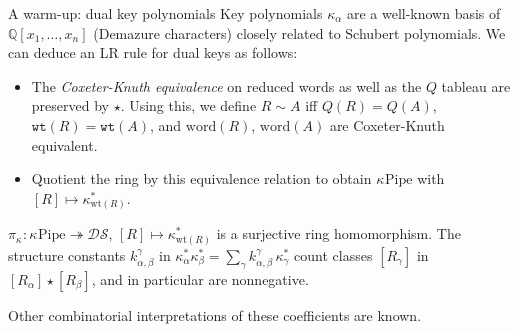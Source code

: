 \documentclass[aspectratio=169]{beamer}
\newcommand{\dcoma}{\mathcal{DS}}
\newcommand{\Key}[1]{\kappa_{#1}}
\newcommand{\RC}{\mathrm{Pipe}}
\newcommand{\wtt}{\mathtt{wt}}
\begin{document}
\begin{frame}{A warm-up: dual key polynomials}
  Key polynomials $\Key{\alpha}$ are a well-known basis of $\mathbb{Q}[x_1,\dots,x_n]$ (Demazure characters) closely related to Schubert polynomials. We can deduce an LR rule for dual keys as follows:
  \begin{itemize}
    \item The \emph{Coxeter-Knuth equivalence}  on reduced words \cite{morse2016crystal} as well as the $Q$ tableau \cite{hamaker2014relating} are preserved by $\star$. Using this, we define $R\sim A$ iff $Q(R)=Q(A)$, $\wtt(R)=\wtt(A)$, and $\mathrm{word}(R)$, $\mathrm{word}(A)$ are Coxeter-Knuth equivalent.
    \item Quotient the ring by this equivalence relation to obtain $\Key{}\RC$ with $[R]\mapsto\Key{\mathrm{wt}(R)}^*$.
  \end{itemize}
  \begin{theorem}[S, 2026+]
    $\pi_{\Key{}}:\Key{}\RC \twoheadrightarrow \dcoma$, $[R]\mapsto\Key{\mathrm{wt}(R)}^*$ is a surjective ring homomorphism. The structure constants $k_{\alpha,\beta}^\gamma$ in $\Key{\alpha}^*\Key{\beta}^* = \sum_\gamma k_{\alpha,\beta}^\gamma\,\Key{\gamma}^*$ count classes $[R_\gamma]$ in $[R_\alpha]\star[R_\beta]$, and in particular are nonnegative.
  \end{theorem}
  \vspace{12pt}
  Other combinatorial interpretations of these coefficients are known.
\end{frame}


\end{document}
